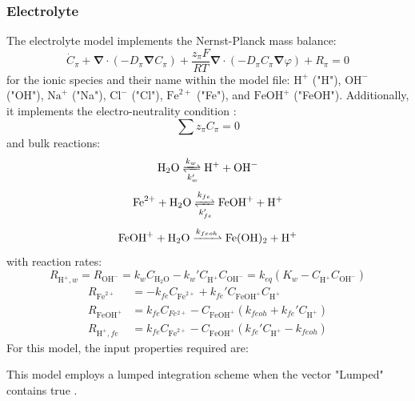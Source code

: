\documentclass[3p]{elsarticle} %
\begin{document}
\subsubsection{Electrolyte}
The electrolyte model implements the Nernst-Planck mass balance:
\begin{equation}
    \dot{C}_{\pi}+\bm{\nabla}\cdot\left(-D_\pi \bm{\nabla}C_\pi\right) + \frac{z_\pi F}{RT} \bm{\nabla} \cdot \left(-D_\pi C_\pi \bm{\nabla} \varphi\right) +R_\pi = 0 
\end{equation}
for the ionic species and their name within the model file: $\mathrm{H}^+$ ("H"), $\mathrm{OH}^-$ ("OH"), $\mathrm{Na}^+$ ("Na"), $\mathrm{Cl}^-$ ("Cl"), $\mathrm{Fe}^{2+}$ ("Fe"), and $\mathrm{FeOH}^{+}$ ("FeOH"). Additionally, it implements the electro-neutrality condition \citep{Feldberg2000, Sarkar2011}:
\begin{equation}
	\sum z_\pi C_\pi = 0
\end{equation}
and bulk reactions:
\begin{equation}
    \mathrm{H}_2\mathrm{O} \xrightleftharpoons[k_{w}']{k_{w}} \mathrm{H}^+ + \mathrm{OH}^- \label{react:water}
\end{equation}
\begin{equation}
    \mathrm{Fe}^{2+} + \mathrm{H}_2\mathrm{O} \xrightleftharpoons[k_{fe}']{k_{fe}} \mathrm{FeOH}^+ + \mathrm{H}^+ \label{react:fe_feoh}
\end{equation}
\begin{equation}
    \mathrm{FeOH}^{+} + \mathrm{H}_2\mathrm{O} \xrightharpoonup{k_{feoh}} \mathrm{Fe}(\mathrm{OH})_2 + \mathrm{H}^+ \label{react:feoh_feoh2}
\end{equation}
with reaction rates:
\begin{equation}
    R_{\mathrm{H}^+,w}=R_{\mathrm{OH}^-} = k_{w}C_{\mathrm{H}_2\mathrm{O}} - k_{w}'C_{\mathrm{H}^+}C_{\mathrm{OH}^-}  = k_{eq} \left(K_w-C_{\mathrm{H}^+} C_{\mathrm{OH}^-} \right) \label{eq:water_react}
\end{equation}
\begin{align}
    R_{\mathrm{Fe}^{2+}}&=-k_{fe}C_{\mathrm{Fe}^{2+}}+k_{fe}'C_{\mathrm{FeOH}^+}C_{\mathrm{H}^+} \\
    R_{\mathrm{FeOH}^+}&=k_{fe}C_{Fe^{2+}}-C_{\mathrm{FeOH}^+}(k_{feoh}+k_{fe}'C_{\mathrm{H}^+})\\
    R_{\mathrm{H}^+,fe}&=k_{fe}C_{\mathrm{Fe}^{2+}}-C_{\mathrm{FeOH}^+}(k_{fe}'C_{\mathrm{H}^+}-k_{feoh}) \label{eq:H_Part2}
\end{align}
For this model, the input properties required are:

This model employs a lumped integration scheme when the vector "Lumped" contains true \citep{Hageman2023Lumped}.
\end{document}
